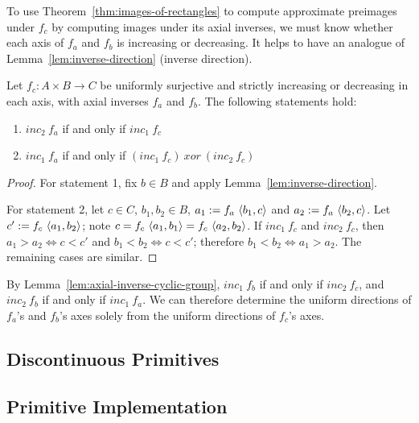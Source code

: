 \documentclass[preprint]{sigplanconf}
\begin{document}
To use Theorem~\ref{thm:images-of-rectangles} to compute approximate preimages under $f_c$ by computing images under its axial inverses, we must know whether each axis of $f_a$ and $f_b$ is increasing or decreasing.
It helps to have an analogue of Lemma~\ref{lem:inverse-direction} (inverse direction).

\begin{theorem}
Let $f_c : A \times B \to C$ be uniformly surjective and strictly increasing or decreasing in each axis, with axial inverses $f_a$ and $f_b$.
The following statements hold:
\begin{enumerate}
	\item $inc_2~f_a$ if and only if $inc_1~f_c$
	\item $inc_1~f_a$ if and only if $(inc_1~f_c)~xor~(inc_2~f_c)$
\end{enumerate}
\end{theorem}
\begin{proof}
For statement 1, fix $b \in B$ and apply Lemma~\ref{lem:inverse-direction}.

For statement 2, let $c \in C$, $b_1,b_2 \in B$, $a_1 := f_a~\langle{b_1,c}\rangle$ and $a_2 := f_a~\langle{b_2,c}\rangle$.
Let $c' := f_c~\langle{a_1,b_2}\rangle$; note $c = f_c~\langle{a_1,b_1}\rangle = f_c~\langle{a_2,b_2}\rangle$.
If $inc_1~f_c$ and $inc_2~f_c$, then $a_1 > a_2 \iff c < c'$ and $b_1 < b_2 \iff c < c'$; therefore $b_1 < b_2 \iff a_1 > a_2$.
The remaining cases are similar.
\end{proof}

By Lemma~\ref{lem:axial-inverse-cyclic-group}, $inc_1~f_b$ if and only if $inc_2~f_c$, and $inc_2~f_b$ if and only if $inc_1~f_a$.
We can therefore determine the uniform directions of $f_a$'s and $f_b$'s axes solely from the uniform directions of $f_c$'s axes.


\subsection{Discontinuous Primitives}

\subsection{Primitive Implementation}
\label{sec:primitive-implementation}
\end{document}

